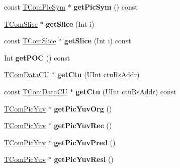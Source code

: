 \begin{DoxyCompactItemize}
\item 
\mbox{\label{class_t_com_pic_a659d1ce3ea69b904e177c5027cd1b5f5}} 
const \hyperlink{class_t_com_pic_sym}{T\+Com\+Pic\+Sym} $\ast$ {\bfseries get\+Pic\+Sym} () const
\item 
\mbox{\label{class_t_com_pic_addedf8c22692140944c95c5c7a177241}} 
\hyperlink{class_t_com_slice}{T\+Com\+Slice} $\ast$ {\bfseries get\+Slice} (Int i)
\item 
\mbox{\label{class_t_com_pic_ac4921b05553d9774fcf8a03aa719a1b3}} 
const \hyperlink{class_t_com_slice}{T\+Com\+Slice} $\ast$ {\bfseries get\+Slice} (Int i) const
\item 
\mbox{\label{class_t_com_pic_aec7a831304bd4a63e702abd8b075d858}} 
Int {\bfseries get\+P\+OC} () const
\item 
\mbox{\label{class_t_com_pic_ab26eac7b8d3669779bbec5bdded7be01}} 
\hyperlink{class_t_com_data_c_u}{T\+Com\+Data\+CU} $\ast$ {\bfseries get\+Ctu} (U\+Int ctu\+Rs\+Addr)
\item 
\mbox{\label{class_t_com_pic_a035d64371b23fca1dfde85183047e219}} 
const \hyperlink{class_t_com_data_c_u}{T\+Com\+Data\+CU} $\ast$ {\bfseries get\+Ctu} (U\+Int ctu\+Rs\+Addr) const
\item 
\mbox{\label{class_t_com_pic_a22af78dde4cb3e3322d13ba6256bbf3f}} 
\hyperlink{class_t_com_pic_yuv}{T\+Com\+Pic\+Yuv} $\ast$ {\bfseries get\+Pic\+Yuv\+Org} ()
\item 
\mbox{\label{class_t_com_pic_a19afc0c53056e14aaacea2561916bf0e}} 
\hyperlink{class_t_com_pic_yuv}{T\+Com\+Pic\+Yuv} $\ast$ {\bfseries get\+Pic\+Yuv\+Rec} ()
\item 
\mbox{\label{class_t_com_pic_afaddfe93ea7e2f12dc9e843eb27277f2}} 
\hyperlink{class_t_com_pic_yuv}{T\+Com\+Pic\+Yuv} $\ast$ {\bfseries get\+Pic\+Yuv\+Pred} ()
\item 
\mbox{\label{class_t_com_pic_a95e036f2f1718dd2087424da118d52b3}} 
\hyperlink{class_t_com_pic_yuv}{T\+Com\+Pic\+Yuv} $\ast$ {\bfseries get\+Pic\+Yuv\+Resi} ()

\end{DoxyCompactItemize}
